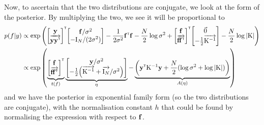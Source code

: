 \documentclass[a4paper]{article}
\theoremstyle{definition}
\begin{document}
Now, to ascertain that the two distributions are conjugate, we look at the form of the posterior. By multiplying the two, we see it will be proportional to
\begin{align}
p(f|y) &\propto \exp{\left(\begin{bmatrix} \vy  \\ \overrightarrow{\vy\vy\transpose}\end{bmatrix}\transpose\begin{bmatrix} \vf/\sigma^2 \\ -\mathrm I_N/(2\sigma^2)\end{bmatrix} - \frac{1}{2\sigma^2} \vf\transpose\vf - \frac{N}{2} \log{\sigma^2} + \begin{bmatrix} \vf \\ \overrightarrow{\vf  \vf \transpose}\end{bmatrix}\transpose\begin{bmatrix} \vec{0} \\ -\frac{1}{2}\overrightarrow{\mathrm K^{-1}}\end{bmatrix} - \frac{N}{2} \log{\detbar{\mathrm K}}\right)} \\
&\propto  \exp{\left(
\underbrace{\begin{bmatrix}\vf \\ \overrightarrow{\vf  \vf \transpose}\end{bmatrix}\transpose}_{t(f)}
\underbrace{\begin{bmatrix} \vy/\sigma^2 \\ -\frac{1}{2}\left(\overrightarrow{\mathrm K^{-1}}+\overrightarrow{\mathrm I_N} / \sigma^2\right)\end{bmatrix}}_{\eta}
-\underbrace{\left(\vy\transpose\mathrm K^{-1}\vy+ \frac{N}{2} (\log{\sigma^2} + \log{\detbar{\mathrm K}})\right)}_{A(\eta)}
\right)}
\end{align}
and we have the posterior in exponential family form (so the two distributions are conjugate), with the normalisation constant $h$ that could be found by normalising the expression with respect to $\mathbf{f}$.
\end{document}

